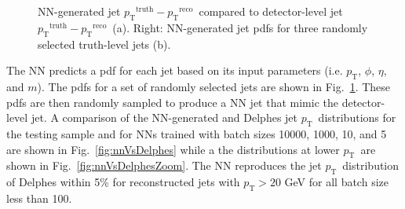 \documentclass[showpacs,showkeys,preprint,prd,nofootinbib,linenumbers,12pt]{revtex4-1}
\def\pt{\ensuremath{p_{\mathrm{T}}}}
\def\ptRes{\ensuremath{\pt^{\mathrm{truth}}-\pt^{\mathrm{reco}}}}
\begin{document}
\begin{figure}[htb]
  \caption{NN-generated jet \ptRes\ compared to detector-level jet \ptRes\ (a). Right: NN-generated jet pdfs for three randomly selected truth-level jets (b).}
  \label{fig:pdfComp}
\end{figure}

The NN predicts a pdf for each jet based on its input parameters (i.e. \pt, $\phi$, $\eta$, and $m$). The pdfs for a set of randomly selected jets are shown in Fig.~\ref{fig:pdfComp}. These pdfs are then randomly sampled to produce a NN jet that mimic the detector-level jet. A comparison of the NN-generated and Delphes jet \pt\ distributions for the testing sample and for NNs trained with batch sizes 10000, 1000, 10, and 5 are shown in Fig.~\ref{fig:nnVsDelphes} while a the distributions at lower \pt\ are shown in Fig.~\ref{fig:nnVsDelphesZoom}. The NN reproduces the jet \pt\ distribution of Delphes within 5\% for reconstructed jets with $\pt>20$ GeV for all batch size less than 100. 
\end{document}
